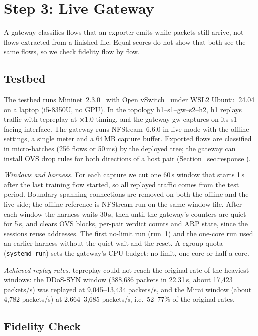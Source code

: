 \section{Step 3: Live Gateway}\label{sec:live}

A gateway classifies flows that an exporter emits while packets still arrive, not flows extracted from a finished file. Equal scores do not show that both see the same flows, so we check fidelity flow by flow.

\subsection{Testbed}\label{sec:testbed}

The testbed runs Mininet~2.3.0~\cite{lantz2010mininet} with Open vSwitch~\cite{pfaff2015ovs} under WSL2 Ubuntu~24.04 on a laptop (i5-8350U, no GPU). In the topology h1--s1--gw--s2--h2, h1 replays traffic with tcpreplay at $\times1.0$ timing, and the gateway gw captures on its s1-facing interface. The gateway runs NFStream~6.6.0 in live mode with the offline settings, a single meter and a 64\,MB capture buffer. Exported flows are classified in micro-batches (256 flows or 50\,ms) by the deployed tree; the gateway can install OVS drop rules for both directions of a host pair (Section~\ref{sec:response}).

\emph{Windows and harness.} For each capture we cut one 60\,s window that starts 1\,s after the last training flow started, so all replayed traffic comes from the test period. Boundary-spanning connections are removed on both the offline and the live side; the offline reference is NFStream run on the same window file. After each window the harness waits 30\,s, then until the gateway's counters are quiet for 5\,s, and clears OVS blocks, per-pair verdict counts and ARP state, since the sessions reuse addresses. The first no-limit run (run~1) and the one-core run used an earlier harness without the quiet wait and the reset. A cgroup quota (\texttt{systemd-run}) sets the gateway's CPU budget: no limit, one core or half a core.

\emph{Achieved replay rates.} tcpreplay could not reach the original rate of the heaviest windows: the DDoS-SYN window (388,686 packets in 22.31\,s, about 17,423 packets/s) was replayed at 9,045--13,434 packets/s, and the Mirai window (about 4,782 packets/s) at 2,664--3,685 packets/s, i.e.\ 52--77\% of the original rates.

\subsection{Fidelity Check}\label{sec:fidelity}

